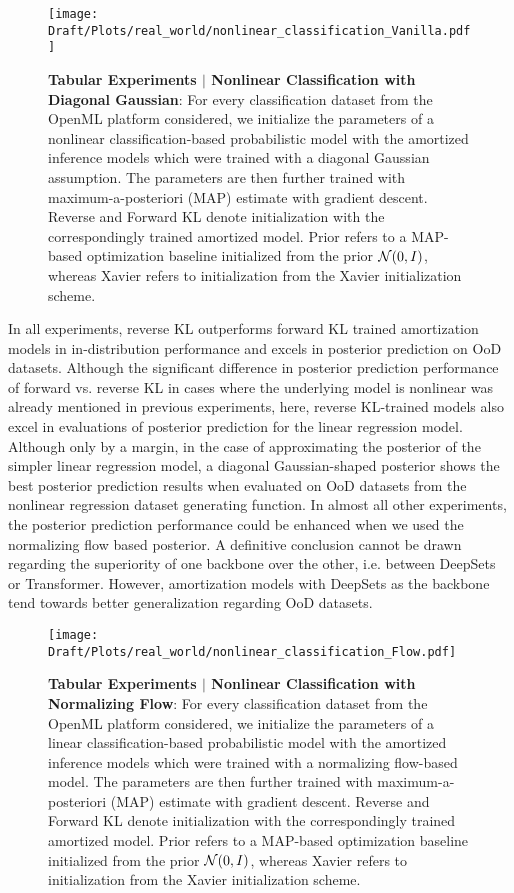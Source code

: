 \begin{figure}
    \centering
    \texttt{[image: Draft/Plots/real\_world/nonlinear\_classification\_Vanilla.pdf]}
    \caption{\textbf{Tabular Experiments $|$ Nonlinear Classification with Diagonal Gaussian}: For every classification dataset from the OpenML platform considered, we initialize the parameters of a nonlinear classification-based probabilistic model with the amortized inference models which were trained with a diagonal Gaussian assumption. The parameters are then further trained with maximum-a-posteriori (MAP) estimate with gradient descent. Reverse and Forward KL denote initialization with the correspondingly trained amortized model. Prior refers to a MAP-based optimization baseline initialized from the prior ${\mathcal{N}}(0, I)$, whereas Xavier refers to initialization from the Xavier initialization scheme.}
    \vspace{-5mm}
    \label{fig:classification_nonlinear_vanilla}
\end{figure}
In all experiments, reverse KL outperforms forward KL trained amortization models in in-distribution performance and excels in posterior prediction on OoD datasets. 
Although the significant difference in posterior prediction performance of forward vs. reverse KL in cases where the underlying model is nonlinear was already mentioned in previous experiments, here, reverse KL-trained models also excel in evaluations of posterior prediction for the linear regression model.
Although only by a margin, in the case of approximating the posterior of the simpler linear regression model, a diagonal Gaussian-shaped posterior shows the best posterior prediction results when evaluated on OoD datasets from the nonlinear regression dataset generating function.
In almost all other experiments, the posterior prediction performance could be enhanced when we used the normalizing flow based posterior. 
A definitive conclusion cannot be drawn regarding the superiority of one backbone over the other, i.e. between DeepSets or Transformer. However, amortization models with DeepSets as the backbone tend towards better generalization regarding OoD datasets.

\begin{figure}
    \centering
    \texttt{[image: Draft/Plots/real\_world/nonlinear\_classification\_Flow.pdf]}
    \caption{\textbf{Tabular Experiments $|$ Nonlinear Classification with Normalizing Flow}: For every classification dataset from the OpenML platform considered, we initialize the parameters of a linear classification-based probabilistic model with the amortized inference models which were trained with a normalizing flow-based model. The parameters are then further trained with maximum-a-posteriori (MAP) estimate with gradient descent. Reverse and Forward KL denote initialization with the correspondingly trained amortized model. Prior refers to a MAP-based optimization baseline initialized from the prior ${\mathcal{N}}(0, I)$, whereas Xavier refers to initialization from the Xavier initialization scheme.}
    \vspace{-5mm}
    \label{fig:classification_nonlinear_flow}
\end{figure}